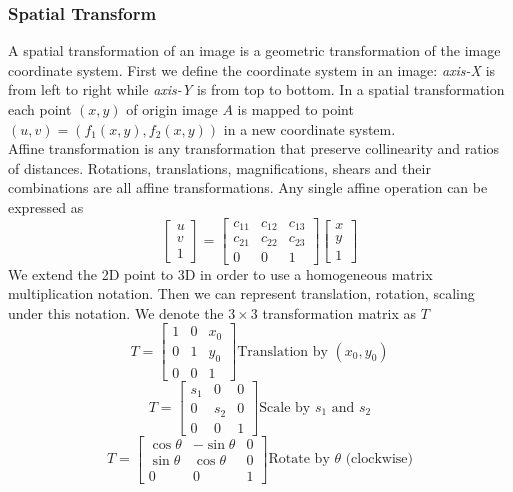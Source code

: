 \subsubsection{Spatial Transform}
A spatial transformation of an image is a geometric transformation of the image coordinate system. First we define the coordinate system in an image: \emph{axis-X} is from left to right while \emph{axis-Y} is from top to bottom. In a spatial transformation each point $(x,y)$ of origin image $A$ is mapped to point $(u,v)=(f_1(x,y), f_2(x,y))$ in a new coordinate system. \\
Affine transformation is any transformation that preserve collinearity and ratios of distances. Rotations, translations, magnifications, shears and their combinations are all affine transformations. Any single affine operation can be expressed as 
\begin{equation} \begin{bmatrix} u\\v\\1 \end{bmatrix} = 
\begin{bmatrix} c_{11} & c_{12} & c_{13} \\
c_{21} & c_{22} & c_{23} \\
0 & 0 & 1 \end{bmatrix} \begin{bmatrix}
x\\y\\1 \end{bmatrix} \end{equation}
We extend the 2D point to 3D in order to use a homogeneous matrix multiplication notation. Then we can represent translation, rotation, scaling under this notation. We denote the $3\times 3$ transformation matrix as $T$
\begin{equation} T= \begin{bmatrix} 1&0&x_0 \\ 0&1&y_0 \\ 0&0&1 \end{bmatrix} \text{Translation by }(x_0, y_0) \end{equation}
\begin{equation} T= \begin{bmatrix} s_1&0&0 \\ 0&s_2&0 \\ 0&0&1 \end{bmatrix} \text{Scale by $s_1$ and $s_2$} \end{equation}
\begin{equation} T= \begin{bmatrix} \cos \theta & -\sin \theta & 0 \\ \sin \theta & \cos \theta & 0 \\ 0&0&1 \end{bmatrix} \text{Rotate by $\theta$ (clockwise)} \end{equation}
